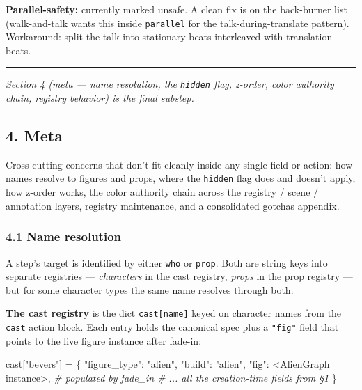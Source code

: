 \documentclass[
  11pt,
]{book}
\newenvironment{Shaded}{}{}
\newcommand{\CommentTok}[1]{\textcolor[rgb]{0.38,0.63,0.69}{\textit{#1}}}
\newcommand{\NormalTok}[1]{#1}
\newcommand{\OperatorTok}[1]{\textcolor[rgb]{0.40,0.40,0.40}{#1}}
\newcommand{\StringTok}[1]{\textcolor[rgb]{0.25,0.44,0.63}{#1}}
\begin{document}
\textbf{Parallel-safety:} currently marked unsafe. A clean fix is on the
back-burner list (walk-and-talk wants this inside \texttt{parallel} for
the talk-during-translate pattern). Workaround: split the talk into
stationary beats interleaved with translation beats.

\begin{center}\rule{0.5\linewidth}{0.5pt}\end{center}

\emph{Section 4 (meta --- name resolution, the \texttt{hidden} flag,
z-order, color authority chain, registry behavior) is the final
substep.}

\subsection{4. Meta}\label{meta}

Cross-cutting concerns that don't fit cleanly inside any single field or
action: how names resolve to figures and props, where the
\texttt{hidden} flag does and doesn't apply, how z-order works, the
color authority chain across the registry / scene / annotation layers,
registry maintenance, and a consolidated gotchas appendix.

\subsubsection{4.1 Name resolution}\label{name-resolution}

A step's target is identified by either \texttt{who} or \texttt{prop}.
Both are string keys into separate registries --- \emph{characters} in
the cast registry, \emph{props} in the prop registry --- but for some
character types the same name resolves through both.

\textbf{The cast registry} is the dict \texttt{cast{[}name{]}} keyed on
character names from the \texttt{cast} action block. Each entry holds
the canonical spec plus a \texttt{"fig"} field that points to the live
figure instance after fade-in:

\begin{Shaded}
\begin{Highlighting}[]
\NormalTok{cast[}\StringTok{"bevers"}\NormalTok{] }\OperatorTok{=}\NormalTok{ \{}
    \StringTok{"figure\_type"}\NormalTok{: }\StringTok{"alien"}\NormalTok{,}
    \StringTok{"build"}\NormalTok{: }\StringTok{"alien"}\NormalTok{,}
    \StringTok{"fig"}\NormalTok{: }\OperatorTok{\textless{}}\NormalTok{AlienGraph instance}\OperatorTok{\textgreater{}}\NormalTok{,  }\CommentTok{\# populated by fade\_in}
    \CommentTok{\# ... all the creation{-}time fields from §1}
\NormalTok{\}}
\end{Highlighting}
\end{Shaded}
\end{document}
